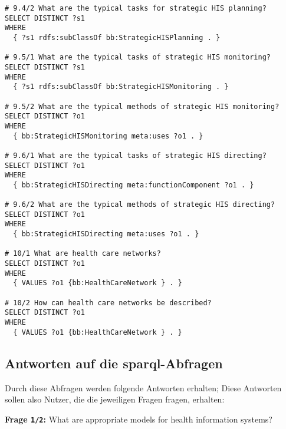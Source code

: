 \begin{lstlisting}[language=SPARQL]
# 9.4/2 What are the typical tasks for strategic HIS planning?
SELECT DISTINCT ?s1
WHERE
  { ?s1 rdfs:subClassOf bb:StrategicHISPlanning . }

# 9.5/1 What are the typical tasks of strategic HIS monitoring?
SELECT DISTINCT ?s1
WHERE
  { ?s1 rdfs:subClassOf bb:StrategicHISMonitoring . }

# 9.5/2 What are the typical methods of strategic HIS monitoring?
SELECT DISTINCT ?o1
WHERE
  { bb:StrategicHISMonitoring meta:uses ?o1 . }

# 9.6/1 What are the typical tasks of strategic HIS directing?
SELECT DISTINCT ?o1
WHERE
  { bb:StrategicHISDirecting meta:functionComponent ?o1 . }

# 9.6/2 What are the typical methods of strategic HIS directing?
SELECT DISTINCT ?o1
WHERE
  { bb:StrategicHISDirecting meta:uses ?o1 . }

# 10/1 What are health care networks?
SELECT DISTINCT ?o1
WHERE
  { VALUES ?o1 {bb:HealthCareNetwork } . }

# 10/2 How can health care networks be described?
SELECT DISTINCT ?o1
WHERE
  { VALUES ?o1 {bb:HealthCareNetwork } . }

\end{lstlisting}

\subsection[Antworten auf die SPARQL-Abfragen]{Antworten auf die \ac{sparql}-Abfragen}

Durch diese Abfragen werden folgende Antworten erhalten;
Diese Antworten sollen also Nutzer, die die jeweiligen Fragen fragen, erhalten:

\textbf{Frage \texttt{1/2}:} What are appropriate models for health information systems?

